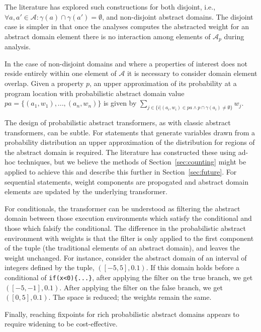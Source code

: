 The literature has explored such constructions for both
disjoint, i.e., $\forall a,a' \in \mathcal{A} : 
\gamma(a) \cap \gamma(a') = \emptyset$, and non-disjoint abstract domains.
The disjoint case is simpler in that once the analyses computes
the abstracted weight for an abstract domain element there is
no interaction among elements of $\mathcal{A}_p$ during analysis.

In the case of non-disjoint domains and where a properties of interest
does not reside entirely within one element of $\mathcal{A}$ it is
necessary to consider domain element overlap. 
Given a property $p$, an upper approximation of its probability 
at a program location with probabilistic abstract domain
value $pa = \{(a_1,w_1), ..., (a_n,w_n)\}$
is given by $\sum_{j \in \{ i \vert (a_i,w_i) \in pa \wedge   
p \cap \gamma(a_i) \not= \emptyset\}} w_j$.

The design of probabilistic abstract transformers, as with 
classic abstract transformers, can be subtle.
For statements that generate variables drawn from a probability
distribution an upper approximation of the distribution for
regions of the abstract domain is required.  The literature
has constructed these using ad-hoc techniques, but we believe
the methods of Section~\ref{sec:counting} might be applied to 
achieve this and describe this further in Section~\ref{sec:future}.
For sequential statements, weight components are propogated
and abstract domain elements are updated by the underlying transformer.

For conditionals, the transformer can be understood
as filtering the abstract domain between those execution environments which
satisfy the conditional and those which falsify the conditional. 
The difference in the probabilistic abstract environment with weights 
is that the filter is only applied to the first component of
the tuple (the traditional elements of an abstract domain), 
and leaves the weight unchanged.
For instance, consider the abstract domain of an interval of 
integers defined by the tuple, $([-5,5],0.1)$. 
If this domain holds before a conditional of 
{\tt if(x<0)\{...\}}, after applying the filter on the true branch, 
we get $([-5,-1],0.1)$. 
After applying the filter on the false branch, we get $([0,5],0.1)$.
The space is reduced; the weights remain the same.

Finally, reaching fixpoints for rich probabilistic abstract domains
appears to require widening \cite{monniaux2000abstract,esparza2011probabilistic} to be
cost-effective.

